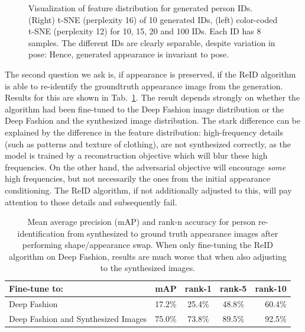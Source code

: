 \begin{figure}[htp]
			\caption{Visualization of feature distribution for generated person IDs. (Right) t-SNE (perplexity 16) of 10 generated IDs, (left) color-coded t-SNE (perplexity 12) for 10, 15, 20 and 100 IDs. Each ID has 8 samples. The different IDs are clearly separable, despite variation in pose: Hence, generated appearance is invariant to pose.}
			\label{fig:tsne}
		\end{figure}

		The second question we ask is, if appearance is preserved, \ie if the ReID algorithm is able to re-identify the groundtruth appearance image from the generation. Results for this are shown in Tab.~\ref{tab:reiddirect}. The result depends strongly on whether the algorithm had been fine-tuned to the Deep Fashion image distribution or the Deep Fashion and the synthesized image distribution. The stark difference can be explained by the difference in the feature distribution: high-frequency details (such as patterns and texture of clothing), are not synthesized correctly, as the model is trained by a reconstruction objective which will blur these high frequencies. On the other hand, the adversarial objective will encourage \textit{some} high frequencies, but not necessarily the ones from the initial appearance conditioning. The ReID algorithm, if not additionally adjusted to this, will pay attention to those details and subsequently fail.

		\begin{table}[htp]
			\centering
			\caption{Mean average precision (mAP) and rank-n accuracy for person re-identification from synthesized to ground truth appearance images after performing shape/appearance swap. When only fine-tuning the ReID algorithm on Deep Fashion, results are much worse that when also adjusting to the synthesized images.}
			\label{tab:reiddirect}
			\begin{tabular}{l|cccr}
				\hline
				Fine-tune to: & mAP & rank-1 & rank-5 & rank-10 \\ \hline
				Deep Fashion & {17.2}\% & {25.4}\% &{48.8}\% & {60.4}\% \\
				Deep Fashion and Synthesized Images& {75.0}\% & {73.8}\% &{89.5}\% & {92.5}\% \\ \hline
			\end{tabular}
		\end{table}






